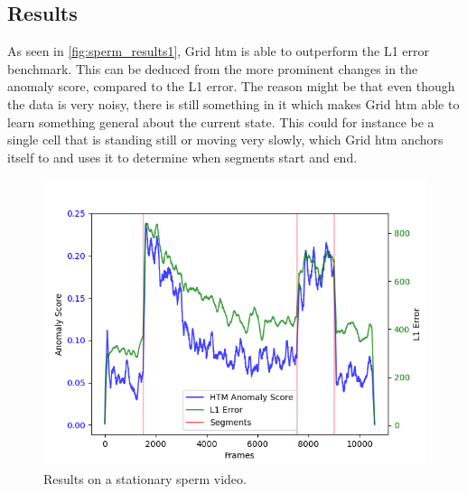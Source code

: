\subsection{Results}
As seen in \autoref{fig:sperm_results1}, Grid \gls*{htm} is able to outperform the L1 error benchmark. This can be deduced from the more prominent changes in the anomaly score, compared to the L1 error. The reason might be that even though the data is very noisy, there is still something in it which makes Grid \gls*{htm} able to learn something general about the current state. This could for instance be a single cell that is standing still or moving very slowly, which Grid \gls*{htm} anchors itself to and uses it to determine when segments start and end.
\begin{figure}[H]
    \centering
    \includegraphics[width=\textwidth]{resources/experiments/sperm/sperm_result1.png}
    \caption[Stationary Video Results]{Results on a stationary sperm video.}
    \label{fig:sperm_results1}
\end{figure}


